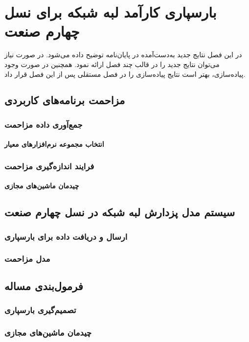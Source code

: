 
\chapter{بارسپاری کارآمد لبه شبکه برای نسل چهارم صنعت}

در این فصل نتایج جدید به‌دست‌آمده در پایان‌نامه توضیح داده می‌شود.
در صورت نیاز می‌توان نتایج جدید را در قالب چند فصل ارائه نمود.
همچنین در صورت وجود پیاده‌سازی، بهتر است نتایج پیاده‌سازی را 
در فصل مستقلی پس از این فصل قرار داد.
\section{مزاحمت برنامه‌های کاربردی}
\subsection{جمع‌آوری داده مزاحمت}
\subsubsection{انتخاب مجموعه نرم‌افزارهای معیار}
\subsection{فرایند اندازه‌گیری مزاحمت}
\subsubsection{چیدمان ماشین‌های مجازی}
\section{سیستم مدل پزدارش لبه شبکه در نسل چهارم صنعت}
\subsection{ارسال و دریافت داده برای بارسپاری}
\subsection{مدل مزاحمت}
\section{فرمول‌بندی مساله}
\subsection{تصمیم‌گیری بارسپاری}
\subsection{چیدمان ماشین‌های مجازی}
